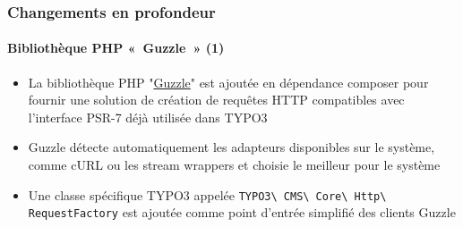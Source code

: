 \begin{frame}[fragile]
	\frametitle{Changements en profondeur}
	\framesubtitle{Bibliothèque PHP «~Guzzle~» (1)}

	\begin{itemize}

		\item La bibliothèque PHP
			"\href{http://docs.guzzlephp.org}{Guzzle}"
			est ajoutée en dépendance composer pour fournir une solution de
			création de requêtes HTTP compatibles avec l'interface PSR-7 déjà
			utilisée dans TYPO3

		\item Guzzle détecte automatiquement les adapteurs disponibles
			sur le système, comme cURL ou les stream wrappers et choisie le
			meilleur pour le système

		\item Une classe spécifique TYPO3 appelée
			\texttt{TYPO3\textbackslash
				CMS\textbackslash
				Core\textbackslash
				Http\textbackslash
				RequestFactory}\newline
			est ajoutée comme point d'entrée simplifié des clients Guzzle

	\end{itemize}

\end{frame}


